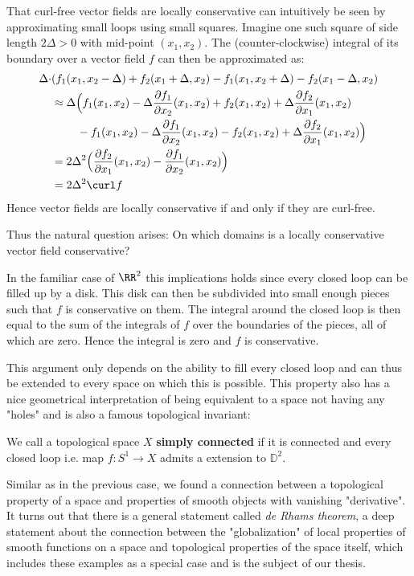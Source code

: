That curl-free vector fields are locally conservative can intuitively be seen by approximating small
loops using small squares. Imagine one such square of side length $2\Delta > 0$ with mid-point
$(x_1, x_2)$. The (counter-clockwise) integral of its boundary over a vector field $f$ can then be
approximated as:
\begin{align*}
	\Delta \cdot & (  f_1(x_1, x_2 - \Delta) + f_2(x_1 + \Delta, x_2) - f_1(x_1, x_2 + \Delta) - f_2(x_1 - \Delta, x_2) \\
	&\approx \Delta \Big( f_1(x_1, x_2) - \Delta \frac{\partial f_1}{\partial x_2}(x_1, x_2) + f_2(x_1, x_2) + \Delta \frac{\partial f_2}{\partial x_1}(x_1, x_2) \\
	       & \phantom{\approx \Delta (}		   - f_1(x_1, x_2) - \Delta \frac{\partial f_1}{\partial x_2} (x_1, x_2) - f_2(x_1, x_2) + \Delta \frac{\partial f_2}{\partial x_1}(x_1, x_2) \Big) \\
	      &= 2\Delta^2 \Big( \frac{\partial f_2}{\partial x_1}(x_1, x_2) - \frac{\partial f_1}{\partial x_2}(x_1, x_2)\Big) \\
	&= 2 \Delta^2 \curl f
\end{align*}
Hence vector fields are locally conservative if and only if they are curl-free.

Thus the natural question arises: On which domains is a locally conservative vector field conservative? 

In the familiar case of $\RR^2$ this implications holds since every closed loop can be filled up
by a disk. This disk can then be subdivided into small enough pieces such that $f$ is conservative on them. The integral around
the closed loop is then equal to the sum of the integrals of $f$ over the boundaries of the pieces, all
of which are zero. Hence the integral is zero and $f$ is conservative.

This argument only depends on the ability to fill every closed loop and can thus be extended to every space on which this is
possible. This property also has a nice geometrical interpretation of being equivalent to a space not having any "holes" and
is also a famous topological invariant:
\begin{definition}
We call a topological space $X$ \textbf{simply connected} if it is connected and every closed loop i.e. map $f: S^1 \to X$ admits a extension to $\mathbb{D}^2$.
\end{definition}

Similar as in the previous case, we found a connection between a topological property of a space and properties of smooth
objects with vanishing "derivative". It turns out that there is a general statement called \textit{de Rhams theorem}, a deep
statement about the connection between the "globalization" of local properties of smooth functions on a space and topological
properties of the space itself, which includes these examples as a special case and is the subject of our thesis.

